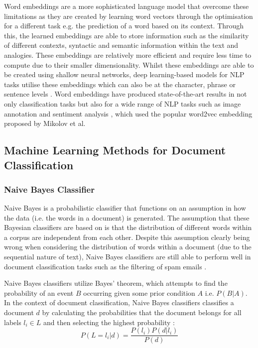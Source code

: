 \documentclass[a4paper,twoside,phd]{BYUPhys}
\begin{document}
Word embeddings are a more sophisticated language model that overcome these limitations as they are created by learning word vectors through the optimisation for a different task e.g. the prediction of a word based on its context. Through this, the learned embeddings are able to store information such as the similarity of different contexts, syntactic and semantic information within the text and analogies. These embeddings are relatively more efficient and require less time to compute due to their smaller dimensionality. Whilst these embeddings are able to be created using shallow neural networks, deep learning-based models for NLP tasks utilise these embeddings which can also be at the character, phrase or sentence levels \cite{Young}. Word embeddings have produced state-of-the-art results in not only classification tasks \cite{Howard2018} but also for a wide range of NLP tasks such as image annotation \cite{Weston} and sentiment analysis \cite{Cambria2017}, which used the popular word2vec embedding proposed by Mikolov et al. \cite{Mikolov}


\subsection{Machine Learning Methods for Document Classification}
\label{MLDocumentClassificaiton}

\subsubsection{Naive Bayes Classifier}
\label{sec:NaiveBayes}

Naive Bayes is a probabilistic classifier that functions on an assumption in how the data (i.e. the words in a document) is generated. The assumption that these Bayesian classifiers are based on is that the distribution of different words within a corpus are independent from each other. Despite this assumption clearly being wrong when considering the distribution of words within a document (due to the sequential nature of text), Naive Bayes classifiers are still able to perform well in document classification tasks such as the filtering of spam emails \cite{Sahami}.

Naive Bayes classifiers utilize Bayes' theorem, which attempts to find the probability of an event $B$ occurring given some prior condition $A$ i.e. $P(B| A)$. In the context of document classification, Naive Bayes classifiers classifies a document $d$ by calculating the probabilities that the document belongs for all labels $l_i \in L$ and then selecting the highest probability \cite{Allahyari2017}:
\begin{equation}
P(L = l_i| d) = \frac{P(l_i)P(d| l_i)}{P(d)}
\end{equation}
\end{document}
